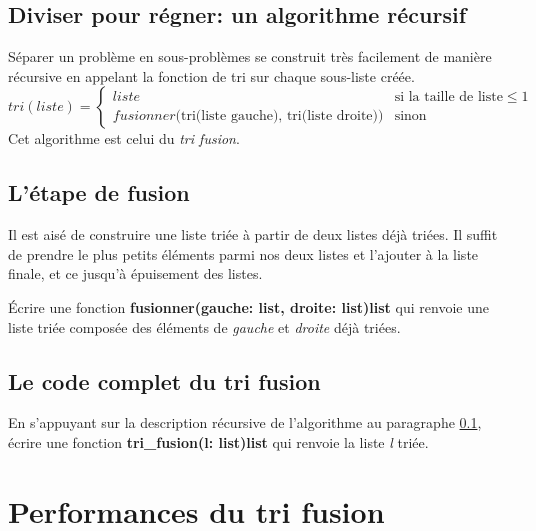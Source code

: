 \documentclass[a4paper,11pt]{article}
\begin{document}
\begin{Form}
\subsection{Diviser pour régner: un algorithme récursif}\label{algo}
Séparer un problème en sous-problèmes se construit très facilement de manière récursive en appelant la fonction de tri sur chaque sous-liste créée.
$$
tri(liste) = \left\{
    \begin{array}{ll}
        liste & \mbox{si la taille de liste} \leq 1 \\
        fusionner(\mbox{tri(liste gauche), tri(liste droite))} & \mbox{sinon }
    \end{array}
\right.
$$
Cet algorithme est celui du \emph{tri fusion}.
\subsection{L'étape de fusion}
Il est aisé de construire une liste triée à partir de deux listes déjà triées. Il suffit de prendre le plus petits éléments parmi nos deux listes et l'ajouter à la liste finale, et ce jusqu'à épuisement des listes.
\begin{activite}
Écrire une fonction \textbf{fusionner(gauche: list, droite: list)\;\rightarrow\;list} qui renvoie une liste triée composée des éléments de \emph{gauche} et \emph{droite} déjà triées.
\end{activite}
\subsection{Le code complet du tri fusion}
\begin{activite}
En s'appuyant sur la description récursive de l'algorithme au paragraphe \ref{algo}, écrire une fonction \textbf{tri\_fusion(l: list)\;\rightarrow\;list} qui renvoie la liste \emph{l} triée.
\end{activite}
\section{Performances du tri fusion}

\end{Form}
\end{document}
